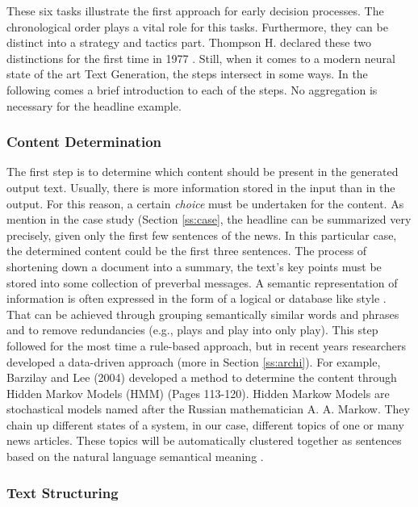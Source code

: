 These six tasks illustrate the first approach for early decision processes. 
The chronological order plays a vital role for this tasks. Furthermore, they can be distinct into a strategy and tactics part.
Thompson H. declared these two distinctions for the first time in 1977 \cite{thompson}. Still, when it comes to a modern neural state of the art Text Generation, the steps intersect in some ways. In the following comes a brief introduction to each of the steps. No aggregation is necessary for the headline example.

\subsubsection{Content Determination}\label{ss:content}

The first step is to determine which content should be present in the generated output text. Usually, there is more information stored in the input than in the output. For this reason, a certain \textit{choice} must be undertaken for the content. As mention in the case study (Section \ref{ss:case}, the headline can be summarized very precisely, given only the first few sentences of the news. In this particular case, the determined content could be the first three sentences. 
The process of shortening down a document into a summary, the text's key points must be stored into some collection of preverbal messages.
A semantic representation of information is often expressed in the form of a logical or database like style \cite{gatt}. That can be achieved through grouping semantically similar words and phrases and to remove redundancies (e.g., plays and play into only play). 
This step followed for the most time a rule-based approach, but in recent years researchers developed a data-driven approach (more in Section \ref{ss:archi}). For example, Barzilay and Lee (2004) developed a method to determine the content through Hidden Markov Models (HMM) \cite{lee} (Pages 113-120). Hidden Markow Models are stochastical models named after the Russian mathematician A. A. Markow. They chain up different states of a system, in our case, different topics of one or many news articles. These topics will be automatically clustered together as sentences based on the natural language semantical meaning \cite{gatt}. 

\subsubsection{Text Structuring}

